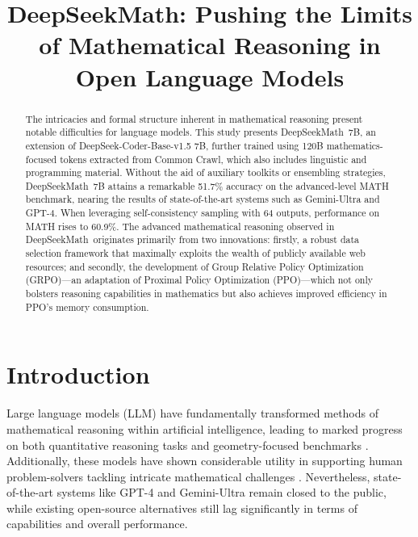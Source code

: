 \title{DeepSeekMath: Pushing the Limits of Mathematical Reasoning in Open Language Models}

\begin{abstract}
The intricacies and formal structure inherent in mathematical reasoning present notable difficulties for language models. This study presents DeepSeekMath~7B, an extension of DeepSeek-Coder-Base-v1.5 7B, further trained using 120B mathematics-focused tokens extracted from Common Crawl, which also includes linguistic and programming material. Without the aid of auxiliary toolkits or ensembling strategies, DeepSeekMath~7B attains a remarkable 51.7\% accuracy on the advanced-level MATH benchmark, nearing the results of state-of-the-art systems such as Gemini-Ultra and GPT-4. When leveraging self-consistency sampling with 64 outputs, performance on MATH rises to 60.9\%. The advanced mathematical reasoning observed in DeepSeekMath~originates primarily from two innovations: firstly, a robust data selection framework that maximally exploits the wealth of publicly available web resources; and secondly, the development of Group Relative Policy Optimization (GRPO)—an adaptation of Proximal Policy Optimization (PPO)—which not only bolsters reasoning capabilities in mathematics but also achieves improved efficiency in PPO's memory consumption.
\end{abstract}

\section{Introduction}

Large language models (LLM) have fundamentally transformed methods of mathematical reasoning within artificial intelligence, leading to marked progress on both quantitative reasoning tasks \citep{MATH} and geometry-focused benchmarks \citep{trinh2024solving}. Additionally, these models have shown considerable utility in supporting human problem-solvers tackling intricate mathematical challenges \citep{tao}. Nevertheless, state-of-the-art systems like GPT-4 \citep{gpt4} and Gemini-Ultra \citep{gemini} remain closed to the public, while existing open-source alternatives still lag significantly in terms of capabilities and overall performance.

